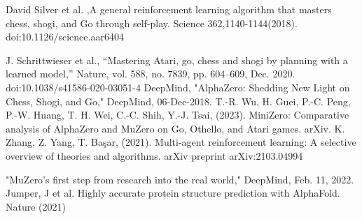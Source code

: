 \documentclass[conference]{IEEEtran}
\begin{document}
\begin{thebibliography}{00}
     David Silver et al. ,A general reinforcement learning algorithm that masters chess, shogi, and Go through self-play. Science 362,1140-1144(2018). doi:10.1126/science.aar6404

     J. Schrittwieser et al., “Mastering Atari, go, chess and shogi by planning with a learned model,” Nature, vol. 588, no. 7839, pp. 604–609, Dec. 2020. doi:10.1038/s41586-020-03051-4 
     DeepMind, "AlphaZero: Shedding New Light on Chess, Shogi, and Go," DeepMind, 06-Dec-2018.
     T.-R. Wu, H. Guei, P.-C. Peng, P.-W. Huang, T. H. Wei, C.-C. Shih, Y.-J. Tsai, (2023). MiniZero: Comparative analysis of AlphaZero and MuZero on Go, Othello, and Atari games. arXiv.
     K. Zhang, Z. Yang, T. Ba\c{s}ar, (2021). Multi-agent reinforcement learning: A selective overview of theories and algorithms. arXiv preprint arXiv:2103.04994

    
     "MuZero’s first step from research into the real world," DeepMind, Feb. 11, 2022.
     Jumper, J et al. Highly accurate protein structure prediction with AlphaFold. Nature (2021)



\end{thebibliography}
\vspace{12pt}
\end{document}
